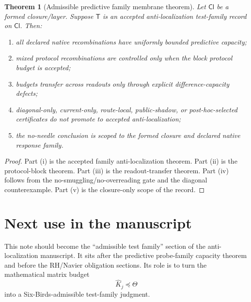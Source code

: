 \documentclass[11pt]{article}
\newtheorem{theorem}{Theorem}
\newcommand{\Loewner}{\preceq}
\begin{document}
\begin{theorem}[Admissible predictive family membrane theorem]
Let $\mathsf{Cl}$ be a formed closure/layer.  Suppose $\mathsf T$ is an accepted anti-localization test-family record on $\mathsf{Cl}$.  Then:
\begin{enumerate}[label=(\roman*)]
\item all declared native recombinations have uniformly bounded predictive capacity;
\item mixed protocol recombinations are controlled only when the block protocol budget is accepted;
\item budgets transfer across readouts only through explicit difference-capacity defects;
\item diagonal-only, current-only, route-local, public-shadow, or post-hoc-selected certificates do not promote to accepted anti-localization;
\item the no-needle conclusion is scoped to the formed closure and declared native response family.
\end{enumerate}
\end{theorem}

\begin{proof}
Part (i) is the accepted family anti-localization theorem.  Part (ii) is the protocol-block theorem.  Part (iii) is the readout-transfer theorem.  Part (iv) follows from the no-smuggling/no-overreading gate and the diagonal counterexample.  Part (v) is the closure-only scope of the record.
\end{proof}

\section{Next use in the manuscript}

This note should become the ``admissible test family'' section of the anti-localization manuscript.  It sits after the predictive probe-family capacity theorem and before the RH/Navier obligation sections.  Its role is to turn the mathematical matrix budget
\[
  \widehat K_j\Loewner\Theta
\]
into a Six-Birds-admissible test-family judgment.
\end{document}
